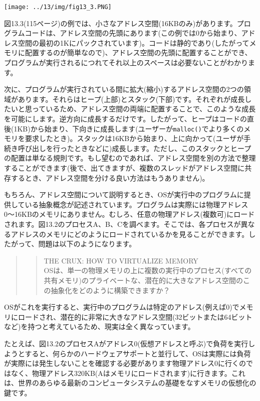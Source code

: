 \texttt{[image: ../13/img/fig13\_3.PNG]}

図13.3(115ページ)の例では、小さなアドレス空間(16KBのみ)があります。プログラムコードは、アドレス空間の先頭にあります(この例では0から始まり、アドレス空間の最初の1Kにパックされています)。コードは静的であり(したがってメモリに配置するのが簡単なので)、アドレス空間の先頭に配置することができ、プログラムが実行されるにつれてそれ以上のスペースは必要ないことがわかります。

次に、プログラムが実行されている間に拡大(縮小)するアドレス空間の2つの領域があります。それらはヒープ(上部)とスタック(下部)です。それぞれが成長したいと思っているため、アドレス空間の両端に配置することで、このような成長を可能にします。逆方向に成長するだけです。したがって、ヒープはコードの直後(1KB)から始まり、下向きに成長します(ユーザーが\texttt{malloc()}でより多くのメモリを要求したとき)。スタックは16KBから始まり、上に向かって(ユーザが手続き呼び出しを行ったときなどに)成長します。ただし、このスタックとヒープの配置は単なる規則です。もし望むのであれば、アドレス空間を別の方法で整理することができます(後で、出てきますが、複数のスレッドがアドレス空間に共存するとき、アドレス空間を分ける良い方法はもうありません)。

もちろん、アドレス空間について説明するとき、OSが実行中のプログラムに提供している抽象概念が記述されています。プログラムは実際には物理アドレス0〜16KBのメモリにありません。むしろ、任意の物理アドレス(複数可)にロードされます。図13.2のプロセスA、B、Cを調べます。そこでは、各プロセスが異なるアドレスのメモリにどのようにロードされているかを見ることができます。したがって、問題は以下のようになります。

\begin{quote}
\begin{quote}
THE CRUX: HOW TO VIRTUALIZE MEMORY\\
OSは、単一の物理メモリの上に複数の実行中のプロセス(すべての共有メモリ)のプライベートな、潜在的に大きなアドレス空間のこの抽象化をどのように構築できますか？
\end{quote}
\end{quote}

OSがこれを実行すると、実行中のプログラムは特定のアドレス(例えば0)でメモリにロードされ、潜在的に非常に大きなアドレス空間(32ビットまたは64ビットなど)を持つと考えているため、現実は全く異なっています。

たとえば、図13.2のプロセスAがアドレス0(仮想アドレスと呼ぶ)で負荷を実行しようとすると、何らかのハードウェアサポートと並行して、OSは実際には負荷が実際には発生しないことを確認する必要があります物理アドレス0に行くのではなく、物理アドレス320KB(Aはメモリにロードされます)に行きます。これは、世界のあらゆる最新のコンピュータシステムの基礎をなすメモリの仮想化の鍵です。

